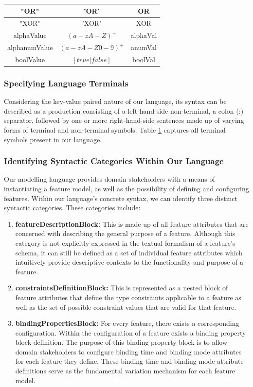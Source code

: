 \documentclass[conference]{IEEEtran}
\begin{document}
\begin{table}[htbp]
\begin{center}
\begin{tabular}{|c|c|c|}
                              "OR" & 'OR' & OR\\ \hline
                              "XOR" & 'XOR' & XOR\\ \hline
                              alphaValue & $(a-zA-Z)^+$ & alphaVal\\ \hline
                              alphanumValue & $(a-zA-Z0-9)^+$ & anumVal\\ \hline
                              boolValue & $[true | false]$ & boolVal\\ \hline
\end{tabular}
\label{tab:langlex}
\end{center}
\end{table}

\subsubsection{Specifying Language Terminals}
Considering the key-value paired nature of our language, its syntax can be described as a production consisting of a left-hand-side non-terminal, a colon (:) separator, followed by one or more right-hand-side sentences made up of varying forms of terminal and non-terminal symbols. Table \ref{tab:langlex} captures all terminal symbols present in our language.

\subsubsection{Identifying Syntactic Categories Within Our Language}
Our modelling language provides domain stakeholders with a means of instantiating a feature model, as well as the possibility of defining and configuring features. Within our language's concrete syntax, we can identify three distinct syntactic categories. These categories include:
\begin{enumerate}
    \item \textbf{featureDescriptionBlock:} This is made up of all feature attributes that are concerned with describing the general purpose of a feature. Although this category is not explicitly expressed in the textual formalism of a feature's schema, it can still be defined as a set of individual feature attributes which intuitively provide descriptive contexts to the functionality and purpose of a feature.
    \item \textbf{constraintsDefinitionBlock:} This is represented as a nested block of feature attributes that define the type constraints applicable to a feature as well as the set of possible constraint values that are valid for that feature.
    \item \textbf{bindingPropertiesBlock:} For every feature, there exists a corresponding configuration. Within the configuration of a feature exists a binding property block definition. The purpose of this binding property block is to allow domain stakeholders to configure binding time and binding mode attributes for each feature they define. These binding time and binding mode attribute definitions serve as the fundamental variation mechanism for each feature model.
\end{enumerate}
 
\end{document}
